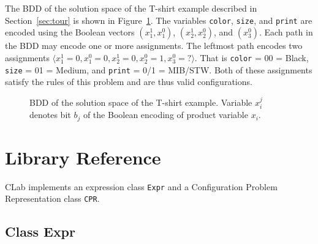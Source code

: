 \documentclass{article}
\begin{document}
The BDD of the solution space of the T-shirt example described in
Section~\ref{sec:tour} is shown in Figure~\ref{fig:shirtBDD}. The
variables \texttt{color}, \texttt{size}, and \texttt{print} are
encoded using the Boolean vectors $(x^1_1,x^0_1)$, $(x^1_2,x^0_2)$,
and $(x^0_3)$. Each path in the BDD may encode one or more
assignments. The leftmost path encodes two assignments $\langle x^1_1
= 0, x^0_1 = 0, x^1_2 = 0, x^0_2 = 1, x^0_3 = ? \rangle$.  That is
\texttt{color} = 00 = Black, \texttt{size} = 01 = Medium, and
\texttt{print} = 0/1 = MIB/STW.  Both of these assignments satisfy the
rules of this problem and are thus valid configurations.
\begin{figure}[h!]
 \centering 
 \begin{center}
   \caption{\label{fig:shirtBDD}BDD of the solution space of the T-shirt example. Variable $x_i^j$ denotes bit $b_j$
   of the Boolean encoding of product variable $x_i$.}
 \end{center}
\end{figure}


\section{Library Reference}

CLab implements an expression class \texttt{Expr} and a Configuration
Problem Representation class \texttt{CPR}.  

\subsection{Class Expr}
\end{document}
